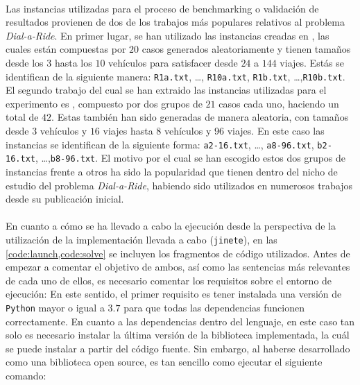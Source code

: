 \documentclass{subfiles}
\begin{document}
        \paragraph{}
        Las instancias utilizadas para el proceso de benchmarking o validación de resultados provienen de dos de los trabajos más populares relativos al problema \emph{Dial-a-Ride}. En primer lugar, se han utilizado las instancias creadas en \cite{cordeau2003tabu}, las cuales están compuestas por $20$ casos generados aleatoriamente y tienen tamaños desde los $3$ hasta los $10$ vehículos para satisfacer desde $24$ a $144$ viajes. Estás se identifican de la siguiente manera: \texttt{R1a.txt}, \dots, \texttt{R10a.txt}, \texttt{R1b.txt}, \dots,\texttt{R10b.txt}. El segundo trabajo del cual se han extraido las instancias utilizadas para el experimento es \cite{ropke2007models}, compuesto por dos grupos de $21$ casos cada uno, haciendo un total de $42$. Estas también han sido generadas de manera aleatoria, con tamaños desde $3$ vehículos y $16$ viajes hasta $8$ vehículos y $96$ viajes. En este caso las instancias se identifican de la siguiente forma: \texttt{a2-16.txt}, \dots, \texttt{a8-96.txt}, \texttt{b2-16.txt}, \dots,\texttt{b8-96.txt}. El motivo por el cual se han escogido estos dos grupos de instancias frente a otros ha sido la popularidad que tienen dentro del nicho de estudio del problema \emph{Dial-a-Ride}, habiendo sido utilizados en numerosos trabajos desde su publicación inicial.

        \paragraph{}
        En cuanto a cómo se ha llevado a cabo la ejecución desde la perspectiva de la utilización de la implementación llevada a cabo (\texttt{jinete}), en las \cref{code:launch,code:solve} se incluyen los fragmentos de código utilizados. Antes de empezar a comentar el objetivo de ambos, así como las sentencias más relevantes de cada uno de ellos, es necesario comentar los requisitos sobre el entorno de ejecución: En este sentido, el primer requisito es tener instalada una versión de \texttt{Python} mayor o igual a $3.7$ para que todas las dependencias funcionen correctamente. En cuanto a las dependencias dentro del lenguaje, en este caso tan solo es necesario instalar la última versión de la biblioteca implementada, la cuál se puede instalar a partir del código fuente. Sin embargo, al haberse desarrollado como una biblioteca open source, es tan sencillo como ejecutar el siguiente comando:
\end{document}
